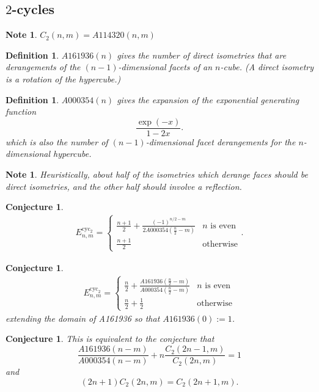 \documentclass{article}
\newtheorem{definition}[theo]{Definition}
\newtheorem{conjecture}[theo]{Conjecture}
\newtheorem{note}[theo]{Note}
\begin{document}
  \subsection{$2$-cycles}
  \begin{note}
    $C_2(n,m) = A114320(n, m)$
  \end{note}
  \begin{definition}
    $A161936(n)$ gives the number of direct isometries that are derangements 
    of the $(n-1)$-dimensional facets of an $n$-cube.
    (A direct isometry is a rotation of the hypercube.)
  \end{definition}
  \begin{definition}
    $A000354(n)$ gives the expansion of the exponential generating function \begin{equation}
      \frac{\exp(-x)}{1 - 2x}.
    \end{equation} which is also the number of $(n-1)$-dimensional facet derangements for 
    the $n$-dimensional hypercube.
  \end{definition}
  \begin{note}
    Heuristically, about half of the isometries which derange faces should be
    direct isometries, and the other half should involve a reflection.
  \end{note}
  \begin{conjecture}
    \begin{align}
      E_{n,m}^{\text{cyc}_2} = \begin{cases}
        \displaystyle\frac{n+1}{2} + \frac{(-1)^{n/2-m}}{2 A000354(\frac n2 - m)} & n \text{ is even}\\
        \displaystyle\frac{n+1}{2} & \text{otherwise}
      \end{cases}.
    \end{align}
  \end{conjecture}
  \begin{conjecture}
    \begin{align}
      E_{n,m}^{\text{cyc}_2} = \begin{cases}
        \displaystyle\frac n 2 + \frac{A161936(\frac n2-m)}{A000354(\frac n2-m)} & n \text{ is even}\\
        \displaystyle\frac n 2 + \frac 1 2 & \text{otherwise}
      \end{cases}
    \end{align} extending the domain of A161936 so that $A161936(0) := 1$.
  \end{conjecture}
  \begin{conjecture}
    This is equivalent to the conjecture that \begin{equation}
      \frac{A161936(n-m)}{A000354(n-m)} + n\frac{C_2(2n-1,m)}{C_2(2n,m)} = 1
    \end{equation} and \begin{equation}
      (2n+1)C_2(2n,m) = C_2(2n+1,m).
    \end{equation}
  \end{conjecture}
\end{document}

